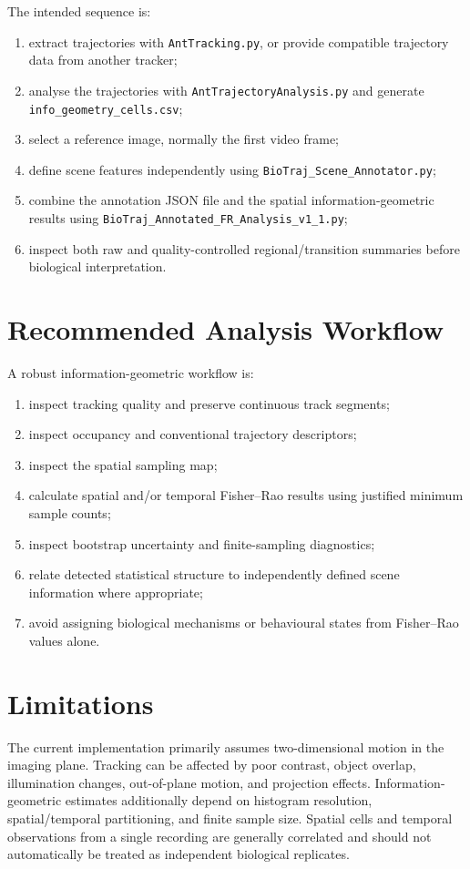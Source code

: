 \documentclass[11pt,a4paper]{article}
\begin{document}
The intended sequence is:
\begin{enumerate}
\item extract trajectories with \texttt{AntTracking.py}, or provide compatible
trajectory data from another tracker;
\item analyse the trajectories with \texttt{AntTrajectoryAnalysis.py} and
generate \texttt{info\_geometry\_cells.csv};
\item select a reference image, normally the first video frame;
\item define scene features independently using
\texttt{BioTraj\_Scene\_Annotator.py};
\item combine the annotation JSON file and the spatial information-geometric
results using \texttt{BioTraj\_Annotated\_FR\_Analysis\_v1\_1.py};
\item inspect both raw and quality-controlled regional/transition summaries
before biological interpretation.
\end{enumerate}

\section{Recommended Analysis Workflow}
A robust information-geometric workflow is:
\begin{enumerate}
\item inspect tracking quality and preserve continuous track segments;
\item inspect occupancy and conventional trajectory descriptors;
\item inspect the spatial sampling map;
\item calculate spatial and/or temporal Fisher--Rao results using justified minimum sample counts;
\item inspect bootstrap uncertainty and finite-sampling diagnostics;
\item relate detected statistical structure to independently defined scene information where appropriate;
\item avoid assigning biological mechanisms or behavioural states from Fisher--Rao values alone.
\end{enumerate}

\section{Limitations}
The current implementation primarily assumes two-dimensional motion in the imaging plane. Tracking can be affected by poor contrast, object overlap, illumination changes, out-of-plane motion, and projection effects. Information-geometric estimates additionally depend on histogram resolution, spatial/temporal partitioning, and finite sample size. Spatial cells and temporal observations from a single recording are generally correlated and should not automatically be treated as independent biological replicates.
\end{document}

